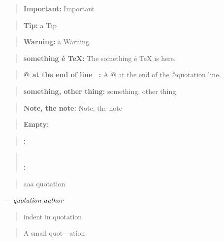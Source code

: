 \documentclass{book}
\begin{document}
\begin{quote}
\textbf{Important:} Important
\end{quote}

\begin{quote}
\textbf{Tip:} a Tip
\end{quote}

\begin{quote}
\textbf{Warning:} a Warning.
\end{quote}

\begin{quote}
\textbf{something \'{e} \TeX{}:} The something \'{e} \TeX{} is here.
\end{quote}

\begin{quote}
\textbf{@ at the end of line \ {}:} A @ at the end of the @quotation line.
\end{quote}

\begin{quote}
\textbf{something, other thing:} something, other thing
\end{quote}

\begin{quote}
\textbf{Note, the note:} Note, the note
\end{quote}

\begin{quote}
\end{quote}

\begin{quote}
\textbf{Empty:} \end{quote}

\begin{quote}
\textbf{:} \end{quote}

\begin{quote}
\textbf{\leavevmode{}\\:} \end{quote}

\begin{quote}
aaa quotation
\end{quote}
\begin{center}
--- \emph{quotation author}
\end{center}

\begin{quote}
indent in quotation
\end{quote}

\begin{quote}
\begin{footnotesize}
A small quot---ation
\end{footnotesize}
\end{quote}
\end{document}
